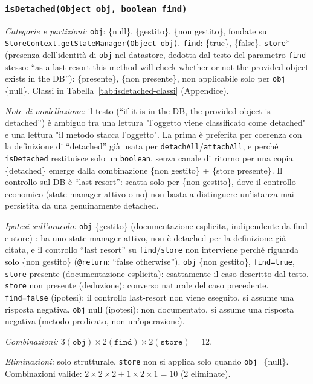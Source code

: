 \subsubsection{\texttt{isDetached(Object obj, boolean find)}}

\textit{Categorie e partizioni:} \texttt{obj}: \{null\}, \{gestito\}, \{non gestito\}, fondate
su \texttt{StoreContext.getStateManager(Object obj)}. \texttt{find}: \{true\}, \{false\}.
\texttt{store}* (presenza dell'identità di \texttt{obj} nel datastore, dedotta dal testo del
parametro \texttt{find} stesso: ``as a last resort this method will check whether or not the
provided object exists in the DB''): \{presente\}, \{non presente\}, non applicabile solo per
\texttt{obj}=\{null\}. Classi in Tabella~\ref{tab:isdetached-classi} (Appendice).

\textit{Note di modellazione:} il testo (``if it is in the DB, the provided object is
detached'') è ambiguo tra una lettura "l'oggetto viene classificato come detached" e una
lettura "il metodo stacca l'oggetto". La prima è preferita per coerenza con
la definizione di ``detached'' già usata per \texttt{detachAll}/\texttt{attachAll}, e perché
\texttt{isDetached} restituisce solo un \texttt{boolean}, senza canale di ritorno per una
copia. \{detached\} emerge dalla
combinazione \{non gestito\} + \{store presente\}. Il controllo sul DB è ``last resort'': scatta
solo per \{non gestito\}, dove il controllo economico (state manager attivo o no) non basta a
distinguere un'istanza mai persistita da una genuinamente detached.

\textit{Ipotesi sull'oracolo:} \texttt{obj} \{gestito\}
 (documentazione esplicita, indipendente da find e store)
: ha uno state manager attivo, non è detached per la
definizione già citata, e il controllo ``last resort'' su \texttt{find}/\texttt{store} non
interviene perché riguarda solo \{non gestito\}
(\texttt{@return}: ``false otherwise''). \texttt{obj} \{non gestito\}, \texttt{find=true},
\texttt{store} presente (documentazione esplicita): esattamente il caso descritto dal testo.
\texttt{store} non presente (deduzione): converso naturale del caso precedente.
\texttt{find=false} (ipotesi): il controllo last-resort non
viene eseguito, si assume una risposta negativa. \texttt{obj} null (ipotesi): non documentato,
si assume una risposta negativa (metodo predicato, non un'operazione).

\textit{Combinazioni:} $3 (\texttt{obj}) \times 2 (\texttt{find}) \times 2 (\texttt{store}) =
12$.

\textit{Eliminazioni:} solo strutturale, \texttt{store} non si applica solo quando
\texttt{obj}=\{null\}. Combinazioni valide: $2 \times 2 \times 2 + 1 \times 2 \times 1 = 10$
(2 eliminate).

